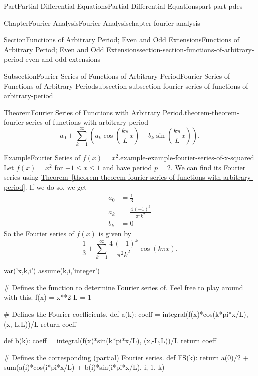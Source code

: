 \documentclass[twoside,10pt,]{book}
\newcommand{\xreffont}{\relax}
\numberwithin{equation}{part}
\newcommand{\amp}{&}
\begin{document}
\begin{partptx}{Part}{Partial Differential Equations}{}{Partial Differential Equations}{}{}{part-part-pdes}
\begin{chapterptx}{Chapter}{Fourier Analysis}{}{Fourier Analysis}{}{}{chapter-fourier-analysis}
\begin{sectionptx}{Section}{Functions of Arbitrary Period; Even and Odd Extensions}{}{Functions of Arbitrary Period; Even and Odd Extensions}{}{}{section-section-functions-of-arbitrary-period-even-and-odd-extensions}
\begin{subsectionptx}{Subsection}{Fourier Series of Functions of Arbitrary Period}{}{Fourier Series of Functions of Arbitrary Period}{}{}{subsection-subsection-fourier-series-of-functions-of-arbitrary-period}
\begin{theorem}{Theorem}{Fourier Series of Functions with Arbitrary Period.}{}{theorem-theorem-fourier-series-of-functions-with-arbitrary-period}
\begin{equation*}
a_{0}+\sum_{k=1}^{\infty}\left(a_{k}\cos\left(\frac{k\pi}{L}x\right)+b_{k}\sin\left(\frac{k\pi}{L}x\right)\right).
\end{equation*}
%
\end{theorem}
\begin{example}{Example}{Fourier Series of \(f(x) = x^{2}\).}{example-example-fourier-series-of-x-squared}%
Let \(f(x) = x^{2}\) for \(-1\leq x\leq 1\) and have period \(p=2\). We can find its Fourier series using \hyperref[theorem-theorem-fourier-series-of-functions-with-arbitrary-period]{Theorem~{\xreffont\ref{theorem-theorem-fourier-series-of-functions-with-arbitrary-period}}}. If we do so, we get%
\begin{align*}
a_{0} \amp= \frac{1}{3}\\
a_{k} \amp= \frac{4 \, \left(-1\right)^{k}}{\pi^{2} k^{2}}\\
b_{k} \amp= 0
\end{align*}
So the Fourier series of \(f(x)\) is given by%
\begin{equation*}
\frac{1}{3} + \sum_{k=1}^{\infty}\frac{4 \, \left(-1\right)^{k}}{\pi^{2} k^{2}}\cos\left(k\pi x\right)\text{.}
\end{equation*}
%
\end{example}
\begin{sageinput}
var('x,k,i')
assume(k,i,'integer')

# Defines the function to determine Fourier series of. Feel free to play around with this.
f(x) = x**2
L = 1

# Defines the Fourier coefficients.
def a(k):
  coeff = integral(f(x)*cos(k*pi*x/L), (x,-L,L))/L
  return coeff

def b(k):
  coeff = integral(f(x)*sin(k*pi*x/L), (x,-L,L))/L
  return coeff

# Defines the corresponding (partial) Fourier series.
def FS(k):
  return a(0)/2 + sum(a(i)*cos(i*pi*x/L) + b(i)*sin(i*pi*x/L), i, 1, k)


\end{sageinput}
\end{subsectionptx}
\end{sectionptx}
\end{chapterptx}
\end{partptx}
\end{document}
